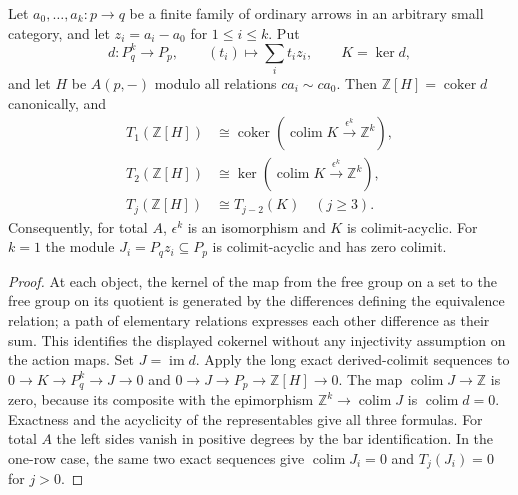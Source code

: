 \begin{lemma}\label{B:row-audit}
Let $a_0,\ldots,a_k:p\to q$ be a finite family of ordinary arrows in
an arbitrary small category, and let $z_i=a_i-a_0$ for $1\leq i\leq k$.
Put
\[
 d:P_q^k\longrightarrow P_p,\qquad
 (t_i)\longmapsto\sum_i t_i z_i,\qquad K=\ker d,
\]
and let $H$ be $A(p,-)$ modulo all relations $ca_i\sim ca_0$.
Then $\mathbb Z[H]=\operatorname{coker}d$ canonically, and
\begin{align*}
 T_1(\mathbb Z[H])&\cong
 \operatorname{coker}(\operatorname{colim}K\xrightarrow{\epsilon^k}\mathbb Z^k),\\
 T_2(\mathbb Z[H])&\cong
 \ker(\operatorname{colim}K\xrightarrow{\epsilon^k}\mathbb Z^k),\\
 T_j(\mathbb Z[H])&\cong T_{j-2}(K)\quad(j\geq3).
\end{align*}
Consequently, for total $A$, $\epsilon^k$ is an isomorphism and $K$
is colimit-acyclic.  For $k=1$ the module
$J_i=P_qz_i\subseteq P_p$ is colimit-acyclic and has zero colimit.
\end{lemma}
\begin{proof}
At each object, the kernel of the map from the free group on a set to
the free group on its quotient is generated by the differences defining
the equivalence relation; a path of elementary relations expresses each
other difference as their sum.  This identifies the displayed cokernel
without any injectivity assumption on the action maps.  Set
$J=\operatorname{im}d$.  Apply the long exact derived-colimit sequences
to $0\to K\to P_q^k\to J\to0$ and
$0\to J\to P_p\to\mathbb Z[H]\to0$.  The map
$\operatorname{colim}J\to\mathbb Z$ is zero, because its composite
with the epimorphism $\mathbb Z^k\to\operatorname{colim}J$ is
$\operatorname{colim}d=0$.  Exactness and the acyclicity of the
representables give all three formulas.  For total $A$ the left sides
vanish in positive degrees by the bar identification.  In the one-row
case, the same two exact sequences give
$\operatorname{colim}J_i=0$ and $T_j(J_i)=0$ for $j>0$.
\end{proof}

